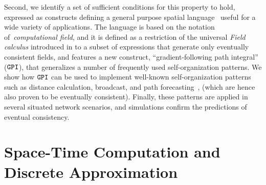 \documentclass[12pt,a4paper,twoside,openright]{book}
\begin{document}
Second, we identify a set of sufficient conditions for this property to hold, expressed as constructs defining a general purpose spatial language~\cite{SpatialIGI2013} useful for a wide variety of applications.
%
The language is based on the notation of~\emph{computational field}, and it is defined as a restriction of the universal \emph{Field calculus} introduced in  to a subset of expressions that generate only eventually consistent fields, and features a new construct, ``gradient-following path integral'' ($\texttt{GPI}$), that generalizes a number of frequently used self-organization patterns.
%
We show how $\texttt{GPI}$ can be used to implement well-known self-organization patterns such as distance calculation, broadcast, and path forecasting~\cite{Montagna-MONET2012,VD-COORD2014-LNCS2014}, (which are hence also proven to be eventually consistent).
%
Finally, these patterns are applied in several situated network scenarios, and simulations confirm the predictions of eventual consistency.

\section{Space-Time Computation and Discrete Approximation}
\end{document}

